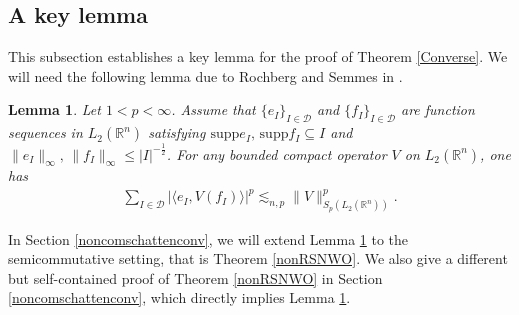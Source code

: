 \documentclass[oneside,english,a4wide]{amsart}
\numberwithin{equation}{section}
\numberwithin{figure}{section}
\theoremstyle{plain}
\theoremstyle{plain}
\theoremstyle{definition}
\theoremstyle{plain}
\newtheorem{lemma}[thm]{Lemma}
\theoremstyle{remark}
\theoremstyle{definition}
\theoremstyle{remark}
\theoremstyle{definition}
\newcommand{\8}{\infty}
\begin{document}
\subsection{A key lemma}
This subsection establishes a key lemma for the proof of Theorem \ref{Converse}. We will need the following lemma due to Rochberg and Semmes in \cite{RSe}.
\begin{lemma}\label{RSNWO}
	Let $1<p<\infty$. Assume that $\{e_I\}_{I\in\mathcal{D}}$ and $\{f_I\}_{I\in\mathcal{D}}$ are function sequences in $L_2(\mathbb{R}^n)$ satisfying $\mathrm{supp}e_I, \,\mathrm{supp}f_I\subseteq I$ and
	$\|e_I\|_{\infty},\,\|f_I\|_{\infty}\le |I|^{-\frac{1}{2}}$. For any bounded compact operator $V$ on $L_2(\mathbb{R}^n)$, one has
	\begin{equation*}
		\begin{aligned}
			\sum_{I\in\mathcal{D}}\big|\langle e_I,V(f_I)\rangle\big|^p\lesssim_{n,p} \|V\|^p_{S_p(L_2(\mathbb{R}^n))}.
		\end{aligned}
	\end{equation*}
\end{lemma}

In Section \ref{noncomschattenconv}, we will extend Lemma \ref{RSNWO} to the semicommutative setting, that is Theorem \ref{nonRSNWO}. We also give a different but self-contained proof of Theorem \ref{nonRSNWO} in Section \ref{noncomschattenconv}, which directly implies Lemma \ref{RSNWO}. 
\end{document}
